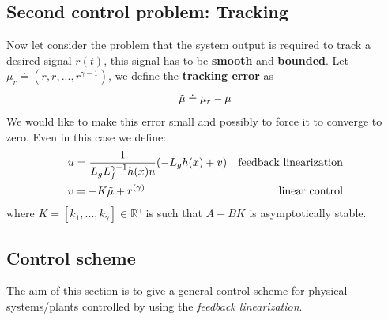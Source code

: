 \hspace*{-5mm}
%
\subsection{Second control problem: Tracking}
Now let consider the problem that the system output is required to track a desired signal $r(t)$, this signal has to be \textbf{smooth} and \textbf{bounded}. Let $\mu_r\doteq(r,\dot{r},..., r^{\gamma-1})$, we define the \textbf{tracking error} as
$$\Tilde{\mu}\doteq\mu_r-\mu$$
We would like to make this error small and possibly to force it to converge to zero. Even in this case we define: 
\begin{equation}\label{eq:tracking}
    \begin{aligned}
        &u=\frac{1}{L_gL_f^{\gamma-1}h(x)u}(-L_gh(x)+v) &\text{feedback linearization}\\
        &v=-K\Tilde{\mu}+r^{(\gamma)} &\text{linear control}
    \end{aligned}
\end{equation}
where $K=[k_1,..., k_\gamma]\in\mathbb{R}^\gamma$ is such that $A-BK$ is asymptotically stable. \\

\hspace*{-5mm}
%

\subsection{Control scheme}
The aim of this section is to give a general control scheme for physical systems/plants controlled by using the \textit{feedback linearization}.  

